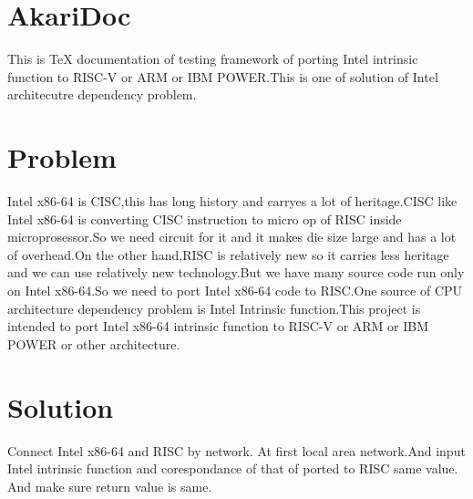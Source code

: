 \documentclass[dvipdfmx]{jsarticle}
\begin{document}
\section{AkariDoc}
This is TeX documentation of testing framework of porting Intel intrinsic function to RISC-V or ARM or IBM POWER.This is one of solution of Intel architecutre dependency problem.\\

\section{Problem}
Intel x86-64 is CISC,this has long history and carryes a lot of heritage.CISC like Intel x86-64 is converting CISC instruction to micro op of RISC inside microprosessor.So we need circuit for it and it makes die size large and has a lot of overhead.On the other hand,RISC is relatively new so it carries less heritage and we can use relatively new technology.But we have many source code run only on Intel x86-64.So we need to port Intel x86-64 code to RISC.One source of CPU architecture dependency problem is Intel Intrinsic function.This project is intended to port Intel x86-64 intrinsic function to RISC-V or ARM or IBM POWER or other architecture.\\

\section{Solution}
Connect Intel x86-64 and RISC by network. At first local area network.And input Intel intrinsic function and corespondance of that of ported to RISC same value. And make sure return value is same.\\
\end{document}

